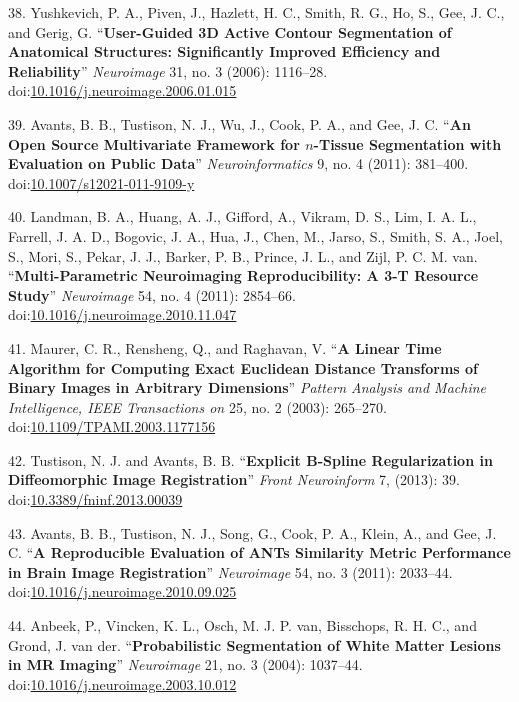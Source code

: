\documentclass[11pt,]{article}
\begin{document}
\hypertarget{ref-Yushkevich:2006aa}{}
38. Yushkevich, P. A., Piven, J., Hazlett, H. C., Smith, R. G., Ho, S.,
Gee, J. C., and Gerig, G. ``\textbf{User-Guided 3D Active Contour
Segmentation of Anatomical Structures: Significantly Improved Efficiency
and Reliability}'' \emph{Neuroimage} 31, no. 3 (2006): 1116--28.
doi:\href{https://doi.org/10.1016/j.neuroimage.2006.01.015}{10.1016/j.neuroimage.2006.01.015}

\hypertarget{ref-Avants:2011aa}{}
39. Avants, B. B., Tustison, N. J., Wu, J., Cook, P. A., and Gee, J. C.
``\textbf{An Open Source Multivariate Framework for \(n\)-Tissue
Segmentation with Evaluation on Public Data}'' \emph{Neuroinformatics}
9, no. 4 (2011): 381--400.
doi:\href{https://doi.org/10.1007/s12021-011-9109-y}{10.1007/s12021-011-9109-y}

\hypertarget{ref-landman2011}{}
40. Landman, B. A., Huang, A. J., Gifford, A., Vikram, D. S., Lim, I. A.
L., Farrell, J. A. D., Bogovic, J. A., Hua, J., Chen, M., Jarso, S.,
Smith, S. A., Joel, S., Mori, S., Pekar, J. J., Barker, P. B., Prince,
J. L., and Zijl, P. C. M. van. ``\textbf{Multi-Parametric Neuroimaging
Reproducibility: A 3-T Resource Study}'' \emph{Neuroimage} 54, no. 4
(2011): 2854--66.
doi:\href{https://doi.org/10.1016/j.neuroimage.2010.11.047}{10.1016/j.neuroimage.2010.11.047}

\hypertarget{ref-maurer2003}{}
41. Maurer, C. R., Rensheng, Q., and Raghavan, V. ``\textbf{A Linear
Time Algorithm for Computing Exact Euclidean Distance Transforms of
Binary Images in Arbitrary Dimensions}'' \emph{Pattern Analysis and
Machine Intelligence, IEEE Transactions on} 25, no. 2 (2003): 265--270.
doi:\href{https://doi.org/10.1109/TPAMI.2003.1177156}{10.1109/TPAMI.2003.1177156}

\hypertarget{ref-Tustison:2013ac}{}
42. Tustison, N. J. and Avants, B. B. ``\textbf{Explicit B-Spline
Regularization in Diffeomorphic Image Registration}'' \emph{Front
Neuroinform} 7, (2013): 39.
doi:\href{https://doi.org/10.3389/fninf.2013.00039}{10.3389/fninf.2013.00039}

\hypertarget{ref-Avants:2011ab}{}
43. Avants, B. B., Tustison, N. J., Song, G., Cook, P. A., Klein, A.,
and Gee, J. C. ``\textbf{A Reproducible Evaluation of ANTs Similarity
Metric Performance in Brain Image Registration}'' \emph{Neuroimage} 54,
no. 3 (2011): 2033--44.
doi:\href{https://doi.org/10.1016/j.neuroimage.2010.09.025}{10.1016/j.neuroimage.2010.09.025}

\hypertarget{ref-Anbeek:2004aa}{}
44. Anbeek, P., Vincken, K. L., Osch, M. J. P. van, Bisschops, R. H. C.,
and Grond, J. van der. ``\textbf{Probabilistic Segmentation of White
Matter Lesions in MR Imaging}'' \emph{Neuroimage} 21, no. 3 (2004):
1037--44.
doi:\href{https://doi.org/10.1016/j.neuroimage.2003.10.012}{10.1016/j.neuroimage.2003.10.012}
\end{document}
